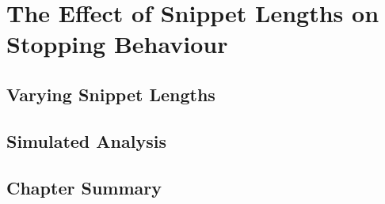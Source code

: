 
\chapter[The Effects of Snippet Lengths on Stopping Behaviour]{The Effect of Snippet Lengths on\\Stopping Behaviour}\label{chap:snippets}

\section{Varying Snippet Lengths}

\section{Simulated Analysis}

\section{Chapter Summary}